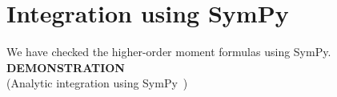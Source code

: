 \documentclass[10pt]{beamer}
\numberwithin{equation}{section}
\begin{document}
    \section{Integration using SymPy}\label{sec:integration-using-sympy}

    \begin{frame}
        \begin{center}
            We have checked the higher-order moment formulas using SymPy.\\
            \vspace{3cm}
            \textbf{DEMONSTRATION} \\
            (Analytic integration using SymPy~\autocite{10.7717/peerj-cs.103})
        \end{center}
    \end{frame}
\end{document}
